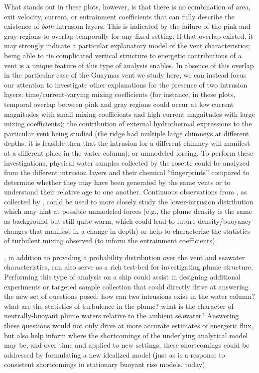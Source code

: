 What stands out in these plots, however, is that there is no combination of area, exit velocity, current, or entrainment coefficients that can fully describe the existence of \emph{both} intrusion layers. This is indicated by the failure of the pink and gray regions to overlap temporally for any fixed setting. If that overlap existed, it may strongly indicate a particular explanatory model of the vent characteristics; being able to tie complicated vertical structure to energetic contributions of a vent is a unique feature of this type of analysis \PHUMES enables. In absence of this overlap in the particular case of the Guaymas vent we study here, we can instead focus our attention to investigate other explanations for the presence of two intrusion layers: time/current-varying mixing coefficients (for instance, in these plots, temporal overlap between pink and gray regions could occur at low current magnitudes with small mixing coefficients and high current magnitudes with large mixing coefficients); the contribution of external hydrothermal expressions to the particular vent being studied (the ridge had multiple large chimneys at different depths, it is feasible then that the intrusion for a different chimney will manifest at a different place in the water column); or unmodeled forcing. To perform these investigations, physical water samples collected by the rosette could be analyzed from the different intrusion layers and their chemical ``fingerprints'' compared to determine whether they may have been generated by the same vents or to understand their relative age to one another. Continuous observations from \Sentry, as collected by \PHORTEX, could be used to more closely study the lower-intrusion distribution which may hint at possible unmodeled forces (e.g., the plume density is the same as background but still quite warm, which could lead to future density/buoyancy changes that manifest in a change in depth) or help to characterize the statistics of turbulent mixing observed (to inform the entrainment coefficients).

\PHUMES, in addition to providing a probability distribution over the vent and seawater characteristics, can also serve as a rich test-bed for investigating plume structure. Performing this type of analysis on a ship could assist in designing additional experiments or targeted sample collection that could directly drive at answering the new set of questions posed: how can two intrusions exist in the water column? what are the statistics of turbulence in the plume? what is the character of neutrally-buoyant plume waters relative to the ambient seawater? Answering these questions would not only drive at more accurate estimates of energetic flux, but also help inform where the shortcomings of the underlying analytical model may be, and over time and applied to new settings, these shortcomings could be addressed by formulating a new idealized model (just as \PHUMES is a response to consistent shortcomings in stationary buoyant rise models, today).


